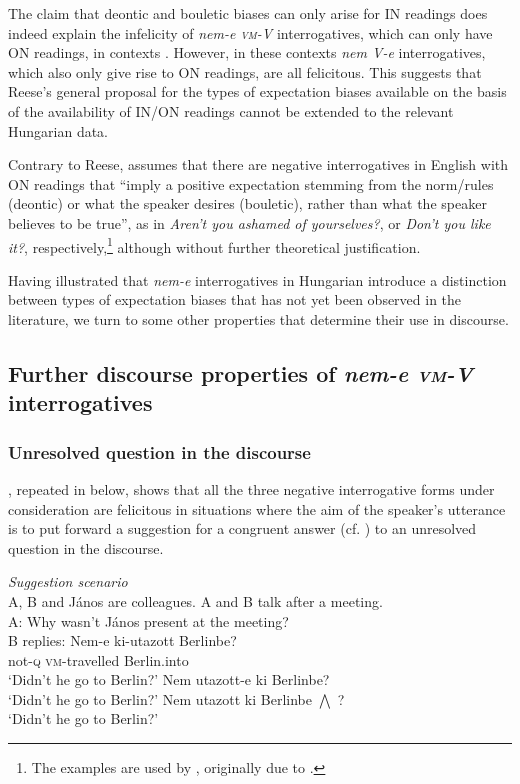 \documentclass[output=paper,colorlinks,citecolor=brown]{langscibook}
\begin{document}
	The claim that deontic and bouletic biases can only arise for IN readings does indeed explain the infelicity of \textit{nem-e \textsc{vm}-V} interrogatives, which can only have ON readings, in contexts . However, in these contexts \textit{nem V-e} interrogatives, which also only give rise to ON readings, are all felicitous. This suggests that Reese's general proposal for the  types of  expectation biases available on the basis of the availability of  IN/ON readings cannot be extended to  the relevant Hungarian data.
	
	Contrary to Reese, \citet[284]{sudo2013} assumes that there are negative interrogatives in English with ON readings that ``imply a positive expectation stemming from the norm/rules (deontic) or what the speaker desires (bouletic), rather than what the speaker believes
	to be true'', as in  \textit{Aren't you ashamed of yourselves?}, or \textit{Don't you like it?}, respectively,\footnote{The examples are used by \citet{asher+reese2007}, originally due to \citet{huddleston+pullum}.} although without further theoretical justification.
	
	Having illustrated that \textit{nem-e} interrogatives in Hungarian introduce a distinction between types of expectation biases that has not yet been observed in the literature, we turn to some other properties that determine their use in discourse.
	
	
\subsection{Further discourse properties of \textit{nem-e \textsc{vm}-V} interrogatives}\label{sect:disc-prop}

	
\subsubsection{Unresolved question in the discourse}\label{sect:unresolved}
	
	, repeated in  below, shows that all the three negative interrogative forms under consideration are felicitous in situations where the aim of the speaker's utterance is to put forward a suggestion for a congruent answer (cf. \citealt{vonstechow1991}) to an unresolved question in the discourse. 

	\ea\label{ex:sugg1}  
	\textit{Suggestion scenario}\\
	A, B and János are colleagues. A and B talk after a meeting.\\
	A: Why wasn't János present at the meeting?\\
	B replies:
	\ea\gll Nem-e  ki-utazott Berlinbe?\\ 
	not\textsc{-q}	\textsc{vm-}travelled Berlin.into\\	
	\glt`Didn't he go to Berlin?' 
	\ex Nem utazott-e ki Berlinbe?\\
	`Didn't he go to Berlin?'
	\ex Nem utazott ki Berlinbe $\bigwedge$ ?\\ 
	`Didn't he go to Berlin?'
	\z
	\z
	
\end{document}

